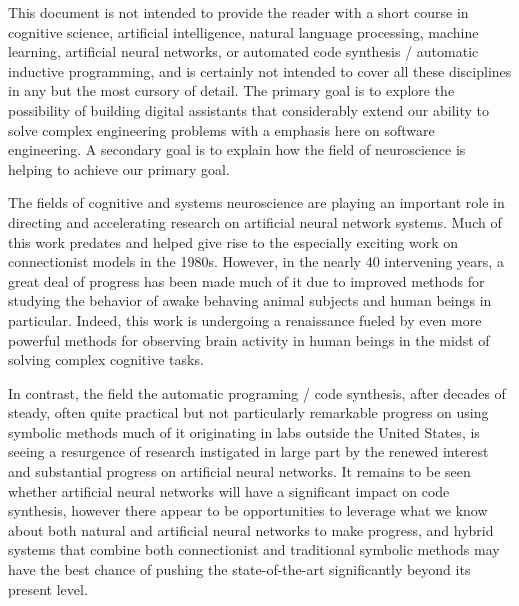 
This document is not intended to provide the reader with a short course in cognitive science, artificial intelligence, natural language processing, machine learning, artificial neural networks, or automated code synthesis / automatic inductive programming, and is certainly not intended to cover all these disciplines in any but the most cursory of detail. The primary goal is to explore the possibility of building digital assistants that considerably extend our ability to solve complex engineering problems with a emphasis here on software engineering. A secondary goal is to explain how the field of neuroscience is helping to achieve our primary goal. 

The fields of cognitive and systems neuroscience are playing an important role in directing and accelerating research on artificial neural network systems. Much of this work predates and helped give rise to the especially exciting work on connectionist models in the 1980s. However, in the nearly 40 intervening years, a great deal of progress has been made much of it due to improved methods for studying the behavior of awake behaving animal subjects and human beings in particular. Indeed, this work is undergoing a renaissance fueled by even more powerful methods for observing brain activity in human beings in the midst of solving complex cognitive tasks.

In contrast, the field the automatic programing / code synthesis, after decades of steady, often quite practical but not particularly remarkable progress on using symbolic methods \emdash{} much of it originating in labs outside the United States, is seeing a resurgence of research instigated in large part by the renewed interest and substantial progress on artificial neural networks. It remains to be seen whether artificial neural networks will have a significant impact on code synthesis, however there appear to be opportunities to leverage what we know about both natural and artificial neural networks to make progress, and hybrid systems that combine both connectionist and traditional symbolic methods may have the best chance of pushing the state-of-the-art significantly beyond its present level.


